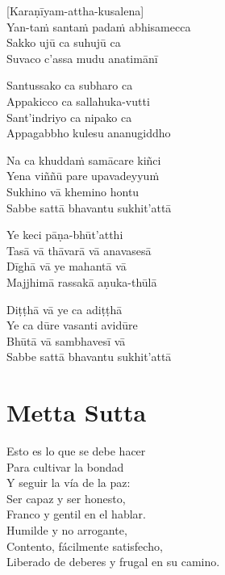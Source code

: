 [Karaṇīyam-attha-kusalena]\\
Yan-taṁ santaṁ padaṁ abhisamecca\\
Sakko ujū ca suhujū ca\\
Suvaco c'assa mudu anatimānī

Santussako ca subharo ca\\
Appakicco ca sallahuka-vutti\\
Sant'indriyo ca nipako ca\\
Appagabbho kulesu ananugiddho

Na ca khuddaṁ samācare kiñci\\
Yena viññū pare upavadeyyuṁ\\
Sukhino vā khemino hontu\\
Sabbe sattā bhavantu sukhit'attā

Ye keci pāṇa-bhūt'atthi\\
Tasā vā thāvarā vā anavasesā\\
Dīghā vā ye mahantā vā\\
Majjhimā rassakā aṇuka-thūlā

Diṭṭhā vā ye ca adiṭṭhā\\
Ye ca dūre vasanti avidūre\\
Bhūtā vā sambhavesī vā\\
Sabbe sattā bhavantu sukhit'attā

\chapter[Metta Sutta]{Metta Sutta}


\begin{leader}
\end{leader}

Esto es lo que se debe hacer\\
Para cultivar la bondad\\
Y seguir la vía de la paz:\\
Ser capaz y ser honesto,\\
Franco y gentil en el hablar.\\
Humilde y no arrogante,\\
Contento, fácilmente satisfecho,\\
Liberado de deberes y frugal en su camino.

